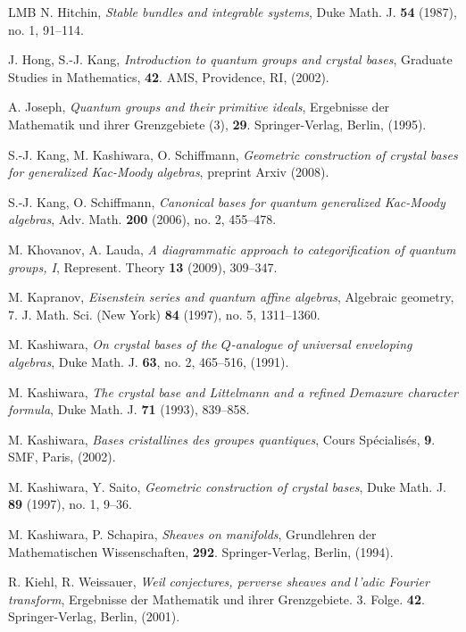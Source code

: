 \documentclass[a4paper,10pt]{amsart}
\numberwithin{equation}{section}
\begin{document}
{\begin{thebibliography}{LMB}
N. Hitchin, \emph{Stable bundles and integrable systems},  Duke Math. J. \textbf{54}  (1987),  no. 1, 91--114. 

J. Hong, S.-J. Kang, \emph{Introduction to quantum groups and crystal bases}, Graduate Studies in Mathematics, \textbf{42}. AMS, Providence, RI, (2002). 

A. Joseph, \emph{Quantum groups and their primitive ideals},  Ergebnisse der Mathematik und ihrer Grenzgebiete (3), \textbf{29}. Springer-Verlag, Berlin, (1995).

S.-J. Kang, M. Kashiwara, O. Schiffmann, \emph{Geometric construction of crystal bases for generalized Kac-Moody algebras}, preprint Arxiv (2008).

S.-J. Kang, O. Schiffmann, \emph{Canonical bases for quantum generalized Kac-Moody algebras}, Adv. Math.  \textbf{200}  (2006),  no. 2, 455--478.

M. Khovanov, A. Lauda, \emph{A diagrammatic approach to categorification of quantum groups, I}, Represent. Theory \textbf{13} (2009), 309--347.

M. Kapranov, \emph{Eisenstein series and quantum affine algebras}, Algebraic geometry, 7.
J. Math. Sci. (New York) \textbf{84} (1997), no. 5, 1311--1360. 

M. Kashiwara, \emph{On crystal bases of the $Q$-analogue of universal enveloping algebras}, Duke Math. J. \textbf{63}, no. 2, 465--516, (1991).

M. Kashiwara, \emph{The crystal base and Littelmann and a refined Demazure character formula}, Duke 
Math. J. \textbf{71} (1993), 839--858. 

M. Kashiwara, \emph{Bases cristallines des groupes quantiques}, Cours Sp\'ecialis\'es, \textbf{9}. SMF, Paris, (2002).

M. Kashiwara, Y. Saito, \emph{Geometric construction of crystal bases}, Duke Math. J. \textbf{89}  (1997),  no. 1, 9--36. 

M. Kashiwara, P. Schapira, \emph{Sheaves on manifolds}, Grundlehren der Mathematischen Wissenschaften, \textbf{292}. Springer-Verlag, Berlin, (1994). 

R. Kiehl, R. Weissauer, \emph{Weil conjectures, perverse sheaves and $l$'adic Fourier transform}, 
Ergebnisse der Mathematik und ihrer Grenzgebiete. 3. Folge. \textbf{42}. Springer-Verlag, Berlin, (2001).


\end{thebibliography}}
\end{document}
